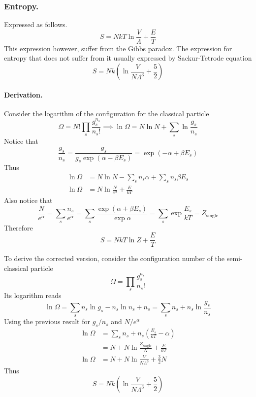 \documentclass[../../../Main.tex]{subfiles}
\begin{document}
\subsubsection{Entropy.} Expressed as follows.
\begin{equation*}
	S=NkT\ln \frac{V}{\Lambda}+\frac{E}{T}
\end{equation*}
This expression however, suffer from the Gibbs paradox. The expression for entropy that does not suffer from it usually expressed by Sackur-Tetrode equation
\begin{equation*}
	S=Nk\left(\ln\frac{V}{N\Lambda^3}+\frac{5}{2}\right)
\end{equation*}

\paragraph{Derivation.} Consider the logarithm of the configuration for the classical particle
\begin{equation*}
	\Omega=N!\prod_s \frac{g_s^{n_s}}{n_s!}\implies
	\ln \Omega=N\ln N +\sum_s\ln\frac{g_s}{n_s}
\end{equation*}
Notice that
\begin{equation*}
	\frac{g_s}{n_s}=\frac{g_s}{g_s\exp(\alpha-\beta E_s)}=\exp(-\alpha+\beta E_s)
\end{equation*}
Thus
\begin{align*}
	\ln \Omega & =N\ln N -\sum_sn_s\alpha +\sum_sn_s\beta E_s \\
	\ln\Omega  & = N\ln \frac{N}{e^\alpha}+\frac{E}{kT}
\end{align*}
Also notice that
\begin{equation*}
	\frac{N}{e^\alpha}=\sum_s\frac{n_s}{e^\alpha}=\sum_s\frac{\exp(\alpha+\beta E_s)}{\exp\alpha}=\sum_s\exp \frac{E_s}{kT}=Z_\text{single}
\end{equation*}
Therefore
\begin{equation*}
	S=NkT\ln Z+\frac{E}{T}
\end{equation*}

To derive the corrected version, consider the configuration number of the semi-classical particle
\begin{equation*}
	\Omega=\prod_s \frac{g_s^{n_s}}{n_s!}
\end{equation*}
Its logarithm reads
\begin{equation*}
	\ln \Omega=\sum_s n_s\ln g_s-n_s\ln n_s +n_s=\sum_s n_s+n_s\ln\frac{g_s}{n_s}
\end{equation*}
Using the previous result for $g_s/n_s$ and $N/e^\alpha$
\begin{align*}
	\ln \Omega & = \sum_s n_s+n_s\left(\frac{E_s}{kT}-\alpha\right) \\
	           & = N+ N\ln\frac{Z_\text{single}}{N}+\frac{E}{kT}    \\
	\ln \Omega & = N+ N\ln\frac{V}{N\Lambda^3}+\frac{3}{2}N
\end{align*}
Thus
\begin{equation*}
	S=Nk\left(\ln\frac{V}{N\Lambda^3}+\frac{5}{2}\right)
\end{equation*}
\end{document}
